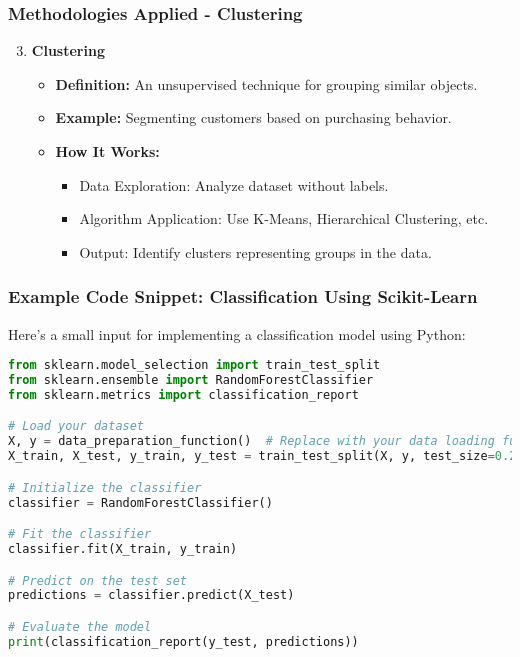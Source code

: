\documentclass[aspectratio=169]{beamer}
\begin{document}
\begin{frame}
    \frametitle{Methodologies Applied - Clustering}
    \begin{enumerate}
        \setcounter{enumi}{2}  %
        \item \textbf{Clustering}
        \begin{itemize}
            \item \textbf{Definition:} An unsupervised technique for grouping similar objects.
            \item \textbf{Example:} Segmenting customers based on purchasing behavior.
            \item \textbf{How It Works:}
            \begin{itemize}
                \item Data Exploration: Analyze dataset without labels.
                \item Algorithm Application: Use K-Means, Hierarchical Clustering, etc.
                \item Output: Identify clusters representing groups in the data.
            \end{itemize}
        \end{itemize}
    \end{enumerate}
\end{frame}

\begin{frame}[fragile]
    \frametitle{Example Code Snippet: Classification Using Scikit-Learn}
    Here’s a small input for implementing a classification model using Python:
    \begin{lstlisting}[language=Python]
from sklearn.model_selection import train_test_split
from sklearn.ensemble import RandomForestClassifier
from sklearn.metrics import classification_report

# Load your dataset
X, y = data_preparation_function()  # Replace with your data loading function
X_train, X_test, y_train, y_test = train_test_split(X, y, test_size=0.2)

# Initialize the classifier
classifier = RandomForestClassifier()

# Fit the classifier
classifier.fit(X_train, y_train)

# Predict on the test set
predictions = classifier.predict(X_test)

# Evaluate the model
print(classification_report(y_test, predictions))
    \end{lstlisting}
\end{frame}
\end{document}
